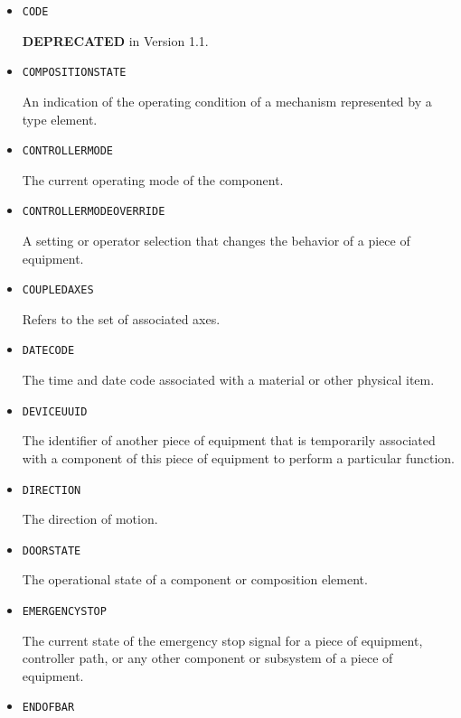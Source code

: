 \begin{itemize}
\item \texttt{CODE}  

\textbf{DEPRECATED} in Version 1.1.


\item \texttt{COMPOSITION\textunderscore STATE}  

An indication of the operating condition of a mechanism represented by a  type element.


\item \texttt{CONTROLLER\textunderscore MODE}  

The current operating mode of the  component.


\item \texttt{CONTROLLER\textunderscore MODE\textunderscore OVERRIDE}  

A setting or operator selection that changes the behavior of a piece of equipment.


\item \texttt{COUPLED\textunderscore AXES}  

Refers to the set of associated axes.


\item \texttt{DATE\textunderscore CODE}  

The time and date code associated with a material or other physical item.


\item \texttt{DEVICE\textunderscore UUID}  

The identifier of another piece of equipment that is temporarily associated with a component of this piece of equipment to perform a particular function.


\item \texttt{DIRECTION}  

The direction of motion.


\item \texttt{DOOR\textunderscore STATE}  

The operational state of a  component or composition element.


\item \texttt{EMERGENCY\textunderscore STOP}  

The current state of the emergency stop signal for a piece of equipment, controller path, or any other component or subsystem of a piece of equipment.


\item \texttt{END\textunderscore OF\textunderscore BAR}  


\end{itemize}

